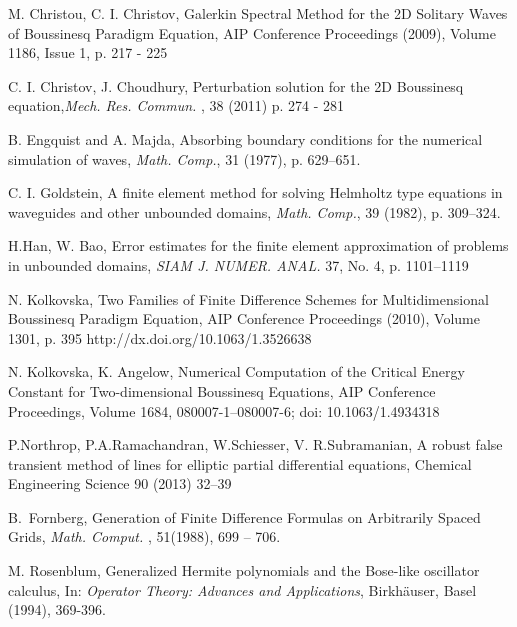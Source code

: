 \documentclass[12pt]{article}
\theoremstyle{theorem}
\theoremstyle{defi}
\begin{document}
\begin{thebibliography}{99}
   M. Christou, C. I. Christov, Galerkin Spectral Method for the 2D Solitary Waves of Boussinesq Paradigm Equation, AIP Conference Proceedings (2009), Volume 1186, Issue 1, p. 217 - 225

 C. I. Christov, J. Choudhury, Perturbation solution for the 2D Boussinesq equation,{\it Mech. Res. Commun. }, 38 (2011) p. 274 - 281

 B. Engquist and A. Majda, Absorbing boundary conditions for the numerical simulation of waves, {\it Math. Comp.}, 31 (1977), p. 629–651.

  C. I. Goldstein, A finite element method for solving Helmholtz type equations in waveguides and other unbounded domains, {\it Math. Comp.}, 39 (1982), p. 309–324.

  H.Han, W. Bao, Error estimates for the finite element approximation of problems in unbounded domains,  {\it SIAM J. NUMER. ANAL.} 37, No. 4, p. 1101–1119

 N. Kolkovska, Two Families of Finite Difference Schemes for Multidimensional Boussinesq Paradigm Equation, AIP Conference Proceedings (2010), Volume 1301, p. 395 http://dx.doi.org/10.1063/1.3526638

 N. Kolkovska, K. Angelow, Numerical Computation of the Critical Energy Constant for Two-dimensional Boussinesq Equations,  AIP Conference Proceedings, Volume 1684, 080007-1–080007-6; doi: 10.1063/1.4934318

 P.Northrop, P.A.Ramachandran, W.Schiesser, V. R.Subramanian, A robust false transient method of lines for elliptic partial differential equations, Chemical Engineering Science 90 (2013) 32–39

B.~Fornberg, Generation of Finite Difference Formulas on Arbitrarily Spaced Grids, 
{\it  Math. Comput.} , 51(1988),  699 -- 706.

 M. Rosenblum,
Generalized Hermite polynomials and the Bose-like oscillator
calculus, In: {\it Operator Theory: Advances and Applications},
Birkh\"auser, Basel (1994), 369-396.

\end{thebibliography}
\end{document}
